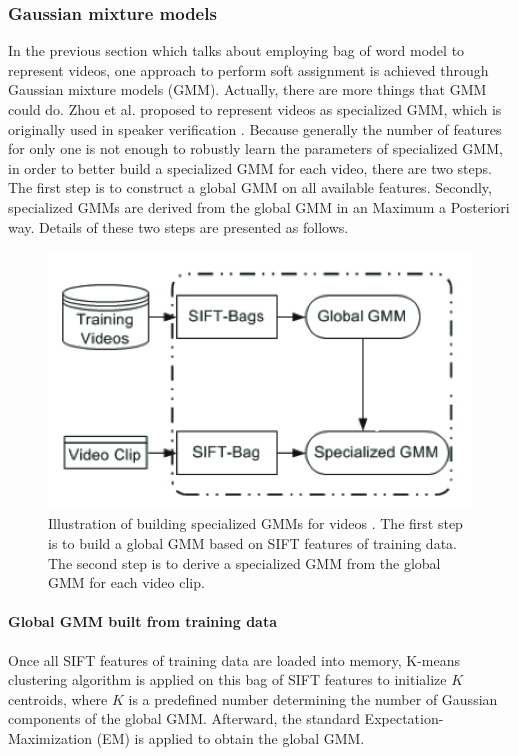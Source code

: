 	\subsubsection{Gaussian mixture models}
	In the previous section which talks about employing bag of word model to represent videos, one approach to perform soft assignment is achieved through Gaussian mixture models (GMM). Actually, there are more things that GMM could do. Zhou et al. \cite{zhou2008sift} proposed to represent videos as specialized GMM, which is originally used in speaker verification \cite{reynolds2000speaker}. Because generally the number of features for only one is not enough to robustly learn the parameters of specialized GMM, in order to better build a specialized GMM for each video, there are two steps. The first step is to construct a global GMM on all available features. Secondly, specialized GMMs are derived from the global GMM in an Maximum a Posteriori way. Details of these two steps are presented as follows.

	\begin{figure}[!ht]
	\centering
		\includegraphics[scale=0.4]{./gmm.png}
	\caption{Illustration of building specialized GMMs for videos \cite{zhou2008sift}. The first step is to build a global GMM based on SIFT features of training data. The second step is to derive a specialized GMM from the global GMM for each video clip.}
	\end{figure}
	\paragraph{Global GMM built from training data} 
	Once all SIFT features of training data are loaded into memory, K-means clustering algorithm is applied on this bag of SIFT features to initialize $K$ centroids, where $K$ is a predefined number determining the number of Gaussian components of the global GMM. Afterward, the standard Expectation-Maximization (EM) is applied to obtain the global GMM. \\

